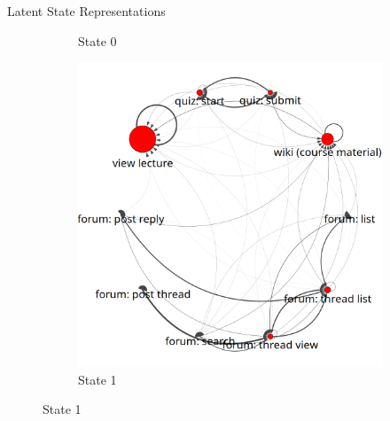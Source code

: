 \documentclass[final,t]{beamer}
\begin{document}
\begin{frame}[fragile]
\begin{columns}[t]
\begin{column}{0.3\textwidth}
\begin{block}{Latent State Representations}
\begin{figure}
\begin{subfigure}[t]{0.9\textwidth}
            \caption{\label{fig:state0}State 0}
          \end{subfigure}

          \begin{subfigure}[t]{0.9\textwidth}
            \includegraphics[width=\textwidth]{../../figures/text-4state/state1.png}
            \caption{\label{fig:state1}State 1}
          \end{subfigure}


\end{figure}
\end{block}
\end{column}
\end{columns}
\end{frame}
\end{document}
